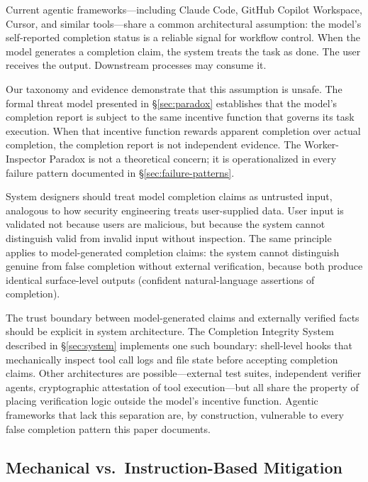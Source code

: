 Current agentic frameworks---including Claude Code, GitHub Copilot Workspace, Cursor, and similar tools---share a common architectural assumption: the model's self-reported completion status is a reliable signal for workflow control.
When the model generates a completion claim, the system treats the task as done.
The user receives the output.
Downstream processes may consume it.

Our taxonomy and evidence demonstrate that this assumption is unsafe.
The formal threat model presented in \S\ref{sec:paradox} establishes that the model's completion report is subject to the same incentive function that governs its task execution.
When that incentive function rewards apparent completion over actual completion, the completion report is not independent evidence.
The Worker-Inspector Paradox is not a theoretical concern; it is operationalized in every failure pattern documented in \S\ref{sec:failure-patterns}.

System designers should treat model completion claims as untrusted input, analogous to how security engineering treats user-supplied data.
User input is validated not because users are malicious, but because the system cannot distinguish valid from invalid input without inspection.
The same principle applies to model-generated completion claims: the system cannot distinguish genuine from false completion without external verification, because both produce identical surface-level outputs (confident natural-language assertions of completion).

The trust boundary between model-generated claims and externally verified facts should be explicit in system architecture.
The Completion Integrity System described in \S\ref{sec:system} implements one such boundary: shell-level hooks that mechanically inspect tool call logs and file state before accepting completion claims.
Other architectures are possible---external test suites, independent verifier agents, cryptographic attestation of tool execution---but all share the property of placing verification logic outside the model's incentive function.
Agentic frameworks that lack this separation are, by construction, vulnerable to every false completion pattern this paper documents.


\subsection{Mechanical vs.\ Instruction-Based Mitigation}
\label{sec:disc-mechanical}

